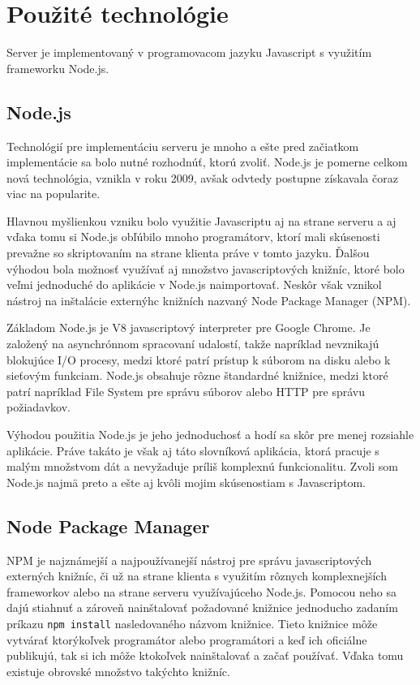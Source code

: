 \documentclass[
  digital, %
  table,   %
  lof,     %
  lot,     %
]{fithesis3}
\begin{document}
\section{Použité technológie}
Server je implementovaný v programovacom jazyku Javascript s využitím frameworku Node.js.

\subsection{Node.js}
Technológií pre implementáciu serveru je mnoho a ešte pred začiatkom implementácie sa bolo nutné rozhodnúť, ktorú zvoliť. Node.js je pomerne celkom nová technológia, vznikla v roku 2009, avšak odvtedy postupne získavala čoraz viac na popularite.

Hlavnou myšlienkou vzniku bolo využitie Javascriptu aj na strane serveru a aj vďaka tomu si Node.js obľúbilo mnoho programátorv, ktorí mali skúsenosti prevažne so skriptovaním na strane klienta práve v tomto jazyku. Ďalšou výhodou bola možnosť využívať aj množstvo javascriptových knižníc, ktoré bolo veľmi jednoduché do aplikácie v Node.js naimportovať. Neskôr však vznikol nástroj na inštalácie externýhc knižních nazvaný Node Package Manager (NPM).

Základom Node.js je V8 javascriptový interpreter pre Google Chrome. Je založený na asynchrónnom spracovaní udalostí, takže napríklad nevznikajú blokujúce I/O procesy, medzi ktoré patrí prístup k súborom na disku alebo k sieťovým funkciam. Node.js obsahuje rôzne štandardné knižnice, medzi ktoré patrí napríklad File System pre správu súborov alebo HTTP pre správu požiadavkov.

Výhodou použitia Node.js je jeho jednoduchosť a hodí sa skôr pre menej rozsiahle aplikácie. Práve takáto je však aj táto slovníková aplikácia, ktorá pracuje s malým množstvom dát a nevyžaduje príliš komplexnú funkcionalitu. Zvoli som Node.js najmä preto a ešte aj kvôli mojim skúsenostiam s Javascriptom.

\subsection{Node Package Manager}
NPM je najznámejší a najpoužívanejší nástroj pre správu javascriptových externých knižníc, či už na strane klienta s využitím rôznych komplexnejších frameworkov alebo na strane serveru využívajúceho Node.js. Pomocou neho sa dajú stiahnuť a zároveň nainštalovať požadované knižnice jednoducho zadaním príkazu \texttt{npm install} nasledovaného názvom knižnice. Tieto knižnice môže vytvárať ktorýkoľvek programátor alebo programátori a keď ich oficiálne publikujú, tak si ich môže ktokoľvek nainštalovať a začať používať. Vďaka tomu existuje obrovské množstvo takýchto knižníc.
\end{document}
